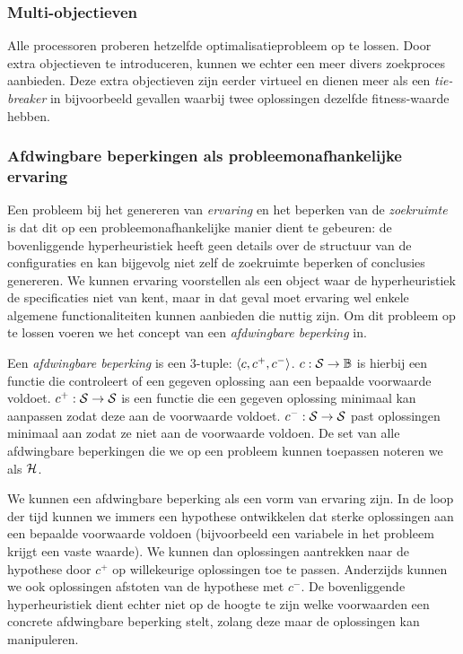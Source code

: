 \subsubsection{Multi-objectieven}
Alle processoren proberen hetzelfde optimalisatieprobleem op te lossen. Door extra objectieven te introduceren, kunnen we echter een meer divers zoekproces aanbieden. Deze extra objectieven zijn eerder virtueel en dienen meer als een \emph{tie-breaker} in bijvoorbeeld gevallen waarbij twee oplossingen dezelfde fitness-waarde hebben.

\subsubsection{Afdwingbare beperkingen als probleemonafhankelijke ervaring}

Een probleem bij het genereren van \emph{ervaring} en het beperken van de \emph{zoekruimte} is dat dit op een probleemonafhankelijke manier dient te gebeuren: de bovenliggende hyperheuristiek heeft geen details over de structuur van de configuraties en kan bijgevolg niet zelf de zoekruimte beperken of conclusies genereren. We kunnen ervaring voorstellen als een object waar de hyperheuristiek de specificaties niet van kent, maar in dat geval moet ervaring wel enkele algemene functionaliteiten kunnen aanbieden die nuttig zijn. Om dit probleem op te lossen voeren we het concept van een \emph{afdwingbare beperking} in.

\begin{definition}
Een \emph{afdwingbare beperking} is een 3-tuple: $\left\langle c,c^+,c^-\right\rangle$. $c:\mathcal{S}\rightarrow\mathbb{B}$ is hierbij een functie die controleert of een gegeven oplossing aan een bepaalde voorwaarde voldoet. $c^+:\mathcal{S}\rightarrow\mathcal{S}$ is een functie die een gegeven oplossing minimaal kan aanpassen zodat deze aan de voorwaarde voldoet. $c^-:\mathcal{S}\rightarrow\mathcal{S}$ past oplossingen minimaal aan zodat ze niet aan de voorwaarde voldoen. De set van alle afdwingbare beperkingen die we op een probleem kunnen toepassen noteren we als $\mathcal{H}$.
\end{definition}

We kunnen een afdwingbare beperking als een vorm van ervaring zijn. In de loop der tijd kunnen we immers een hypothese ontwikkelen dat sterke oplossingen aan een bepaalde voorwaarde voldoen (bijvoorbeeld een variabele in het probleem krijgt een vaste waarde). We kunnen dan oplossingen aantrekken naar de hypothese door $c^+$ op willekeurige oplossingen toe te passen. Anderzijds kunnen we ook oplossingen afstoten van de hypothese met $c^-$. De bovenliggende hyperheuristiek dient echter niet op de hoogte te zijn welke voorwaarden een concrete afdwingbare beperking stelt, zolang deze maar de oplossingen kan manipuleren.

